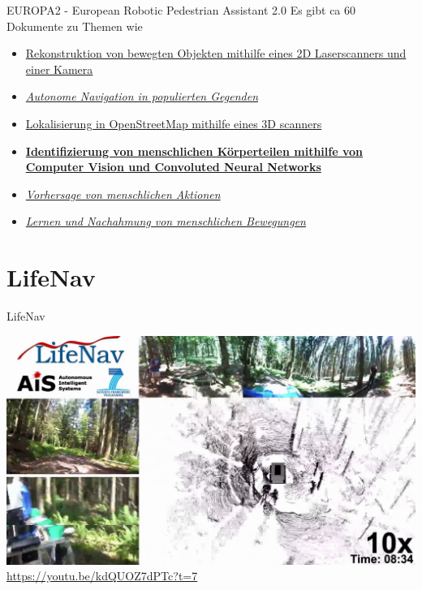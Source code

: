 \documentclass[aspectratio=169]{beamer}
\begin{document}
  \begin{frame}{EUROPA2 - European Robotic Pedestrian Assistant 2.0}
  	Es gibt ca 60 Dokumente zu Themen wie
  	\begin{itemize}
  		\item \href{http://europa2.informatik.uni-freiburg.de/files/ilg14icra.pdf}{Rekonstruktion von bewegten Objekten mithilfe eines 2D Laserscanners und einer Kamera}
  		\pause
  		\item \href{http://europa2.informatik.uni-freiburg.de/files/kuemmerle14jfr.pdf}{\textit{Autonome Navigation in populierten Gegenden}}
  		\pause
  		\item \href{http://europa2.informatik.uni-freiburg.de/files/ruchti15icra.pdf}{Lokalisierung in OpenStreetMap mithilfe eines 3D scanners}
  		\pause
  		\pause
  		\item \href{http://europa2.informatik.uni-freiburg.de/files/oliveira16icra.pdf}{\textbf{Identifizierung von menschlichen Körperteilen mithilfe von Computer Vision und Convoluted Neural Networks}}
  		\pause
  		\item \href{http://europa2.informatik.uni-freiburg.de/files/IROS16_1259_FI.pdf}{\textit{Vorhersage von menschlichen Aktionen}}
  		\pause
  		\item \href{http://europa2.informatik.uni-freiburg.de/files/kretzschmar16ijrr.pdf}{\textit{Lernen und Nachahmung von menschlichen Bewegungen}}
  	\end{itemize}
  \end{frame}
  
  \section{LifeNav}
  \begin{frame}{LifeNav}
  	\begin{center}
  		\includegraphics[scale=0.15]{img/lifenav.png} \\
  		\url{https://youtu.be/kdQUOZ7dPTc?t=7}
  	\end{center}
  \end{frame}
  
\end{document}
